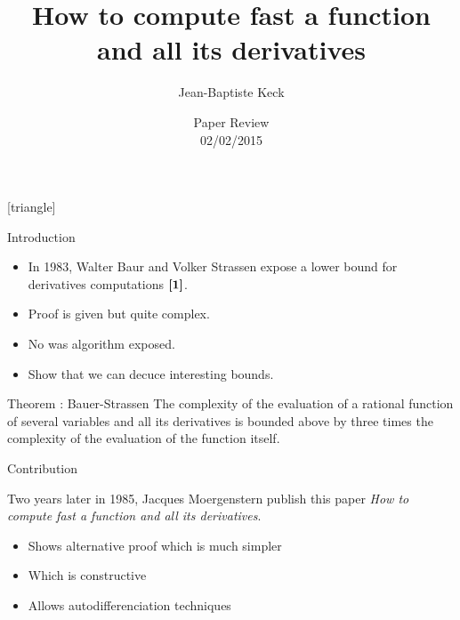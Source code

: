 



[triangle]



\title{\Large How to compute fast a function and all its derivatives}
\author[Keck]{\Large Jean-Baptiste Keck}
\date{\large Paper Review\\ 02/02/2015}

\begin{frame}
    \titlepage
\end{frame}

\begin{frame}{Introduction}

    \begin{itemize} 
        \item In 1983, Walter Baur and Volker Strassen expose a lower bound for derivatives computations $\ccite{1}$.
        \item Proof is given but quite complex.
        \item No was algorithm exposed.
        \item Show that we can decuce interesting bounds.
    \end{itemize}

    \begin{block}{Theorem : Bauer-Strassen}
        The complexity of the evaluation of a rational function of several variables and all its derivatives is bounded above by three times the complexity of the evaluation of the function itself.
    \end{block}
\end{frame}

\begin{frame}{Contribution}
       
    Two years later in 1985, Jacques Moergenstern publish this paper \textit{How to compute fast a function and all its derivatives}.

    \vskip 0.5cm

    \begin{itemize} 
        \item Shows alternative proof which is much simpler
        \item Which is \alert{constructive} 
        \item Allows autodifferenciation techniques
    \end{itemize}
\end{frame}


